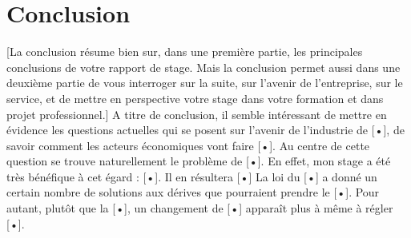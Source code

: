 \documentclass[11pt]{article}
\begin{document}
\part{Conclusion}
[La conclusion résume bien sur, dans une première partie, les principales conclusions de votre rapport de stage. Mais la 
conclusion permet aussi dans une deuxième partie de vous interroger sur la suite, sur l’avenir de l’entreprise, sur le 
service, et de mettre en perspective votre stage dans votre formation et dans projet professionnel.]
A titre de conclusion, il semble intéressant de mettre en évidence les questions actuelles qui se posent sur l’avenir de 
l’industrie de [•], de savoir comment les acteurs économiques vont faire [•]. Au centre de cette question se trouve 
naturellement le problème de [•]. En effet, mon stage a été très bénéfique à cet égard : [•]. Il en résultera [•]
La loi du [•] a donné un certain nombre de solutions aux dérives que pourraient prendre le [•]. Pour autant, plutôt 
que la [•], un changement de [•] apparaît plus à même à régler [•].
\end{document}
